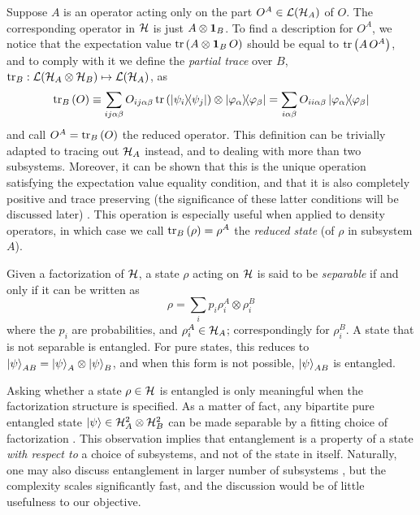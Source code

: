 		Suppose $A$ is an operator acting only on the part $O^A \in \mathcal{L}(\mathcal{H}_A)$ of $O$. The corresponding operator in $\mathcal{H}$ is just $A \otimes \mathbf{1}_B$. To find a description for $O^A$, we notice that the expectation value $\text{tr}\left( A \otimes \mathbf{1}_B \, O \right)$ should be equal to $\text{tr}\left(  A \, O^A \right)$, and to comply with it we define the \emph{partial trace} over $B$, $\text{tr}_B : \mathcal{L}(\mathcal{H}_A \otimes \mathcal{H}_B) \mapsto \mathcal{L}(\mathcal{H}_A)$, as
		$$
			\text{tr}_{B}\left( O \right) \equiv \sum_{ij\alpha\beta} O_{ij\alpha\beta} \,\text{tr}\left( \ketbra{\psi_i}{\psi_j} \right) \otimes \ketbra{\varphi_\alpha}{\varphi_\beta} = \sum_{i\alpha\beta} O_{ii\alpha\beta} \ketbra{\varphi_\alpha}{\varphi_\beta}
		$$
		and call $O^A = \text{tr}_{B}\left( O \right)$ the reduced operator. This definition can be trivially adapted to tracing out $\mathcal{H}_A$ instead, and to dealing with more than two subsystems. Moreover, it can be shown that this is the unique operation satisfying the expectation value equality condition, and that it is also completely positive and trace preserving (the significance of these latter conditions will be discussed later) \cite{}\todo{}. This operation is especially useful when applied to density operators, in which case we call $\text{tr}_{B}\left( \rho \right) = \rho^A$ the \emph{reduced state} (of $\rho$ in subsystem $A$).
	
		Given a factorization of $\mathcal{H}$, a state $\rho$ acting on $\mathcal{H}$ is said to be \emph{separable} if and only if it can be written as 
		\begin{equation}
			\rho = \sum_i p_i \rho_i^A \otimes \rho_i^B
			\label{eq:separable-state}
		\end{equation}
		where the $p_i$ are probabilities, and $\rho_i^A \in \mathcal{H}_A$; correspondingly for $\rho_i ^B$. A state that is not separable is entangled. For pure states, this reduces to $\ket{\psi}_{AB} = \ket{\psi}_A \otimes \ket{\psi}_B$, and when this form is not possible, $\ket{\psi}_{AB}$ is entangled. 
	
		Asking whether a state $\rho \in \mathcal{H}$ is entangled is only meaningful when the factorization structure is specified. As a matter of fact, any bipartite pure entangled state $\ket{\psi} \in \mathcal{H}^{2}_A \otimes \mathcal{H}^{2}_B$ can be made separable by a fitting choice of factorization \cite{terra_2007_singleparticle}. This observation implies that entanglement is a property of a state \emph{with respect to} a choice of subsystems, and not of the state in itself. Naturally, one may also discuss entanglement in larger number of subsystems \cite{horodecki_2009_entanglement}, but the complexity scales significantly fast, and the discussion would be of little usefulness to our objective.
	
